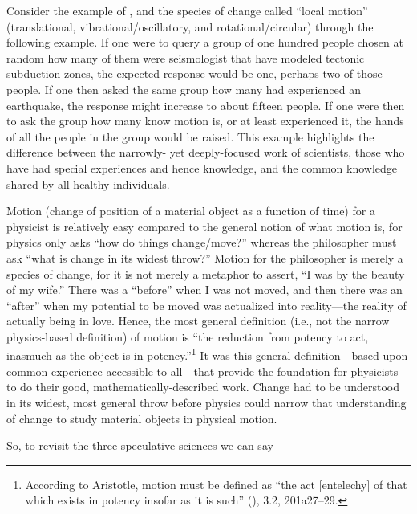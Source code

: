 Consider the example of , and the species of change called ``local motion'' (translational, vibrational/oscillatory, and rotational/circular) through the following example. If one were to query a group of one hundred people chosen at random how many of them were seismologist that have modeled tectonic subduction zones, the expected response would be one, perhaps two of those people. If one then asked the same group how many had experienced an earthquake, the response might increase to about fifteen people. If one were then to ask the group how many know  motion is, or at least experienced it, the hands of all the people in the group would be raised. This example highlights the difference between the narrowly- yet deeply-focused work of scientists, those who have had special experiences and hence knowledge, and the common knowledge shared by all healthy individuals.

Motion (change of position of a material object as a function of time) for a physicist is relatively easy compared to the general notion of what motion is, for physics only asks ``how do things change/move?'' whereas the philosopher must ask ``what is change in its widest throw?'' Motion for the philosopher is merely a species of change, for it is not merely a metaphor to assert, ``I was  by the beauty of my wife.'' There was a ``before'' when I was not moved, and then there was an ``after'' when my potential to be moved was actualized into reality---the reality of actually being in love. Hence, the most general definition (i.e., not the narrow physics-based definition) of motion is ``the reduction from potency to act, inasmuch as the object is in potency.''\footnote{According to Aristotle, motion must be defined as ``the act [entelechy] of that which exists in potency insofar as it is such'' (),  3.2, 201a27--29.} It was this general definition---based upon common experience accessible to all---that provide the foundation for physicists to do their good, mathematically-described work. Change had to be understood in its widest, most general throw before physics could narrow that understanding of change to study material objects in physical motion.

So, to revisit the three speculative sciences we can say

